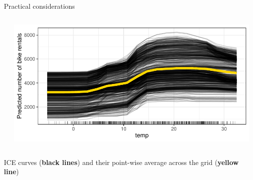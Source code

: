 \documentclass[10pt,compress,t,notes=noshow, xcolor=table]{beamer}
\begin{document}
\begin{frame}{Practical considerations}
\begin{columns}[T, onlytextwidth]
\begin{column}{0.5\textwidth}
\end{column}

\begin{column}{0.5\textwidth}
\centering
\includegraphics[width=\textwidth]{figure/pdp_bike.pdf}

\end{column}
\end{columns}

\centerline{\small
ICE curves (\textbf{black lines}) and their point-wise average across the grid (\textbf{yellow line})%
}
\end{frame}

\endlecture
\end{document}
